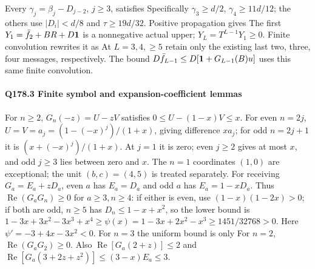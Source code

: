 Every $\gamma_j=\allowbreak \beta_j-D_{j-2}$, $j\ge\allowbreak 3$, satisfies
Specifically $\gamma_3\ge\allowbreak  d/2$, $\gamma_4\ge\allowbreak 11d/12$;
the others use $|D_i|<\allowbreak d/8$ and $\tau\ge\allowbreak 19d/32$.
Positive propagation gives
The first $Y_1=\allowbreak \bar f_2+BR+D\mathbf1$ is a nonnegative actual upper;
$Y_L=\allowbreak T^{L-1}Y_1\ge\allowbreak 0$. Finite convolution rewrites it as
At $L=\allowbreak 3,\allowbreak 4,\allowbreak \ge\allowbreak 5$ retain only the existing last two, three, four messages,
respectively. The bound $D\bar f_{L-1}\le\allowbreak  D[\mathbf1+G_{L-1}(B)u]$
uses this same finite convolution.

\paragraph{Q178.3 Finite symbol and expansion-coefficient lemmas}\label{part:Q178.3}
For $n\ge\allowbreak 2$, $G_n(-z)=\allowbreak U-zV$ satisfies
$0\le\allowbreak  U-(1-x)V\le\allowbreak  x$.
For even $n=\allowbreak 2j$, $U=\allowbreak V=\allowbreak a_j=\allowbreak (1-(-x)^j)/(1+x)$, giving difference
$xa_j$; for odd $n=\allowbreak 2j+1$ it is $(x+(-x)^j)/(1+x)$.
At $j=\allowbreak 1$ it is zero; even $j\ge\allowbreak 2$ gives at most $x$, and odd $j\ge\allowbreak 3$
lies between zero and $x$.
The $n=\allowbreak 1$ coordinates $(1,\allowbreak 0)$ are exceptional; the unit $(b,\allowbreak c)=\allowbreak (4,\allowbreak 5)$
is treated separately.
For receiving $G_a=\allowbreak E_a+zD_a$, even $a$ has $E_a=\allowbreak D_a$ and odd $a$
has $E_a=\allowbreak 1-xD_a$.
Thus $\operatorname{Re}(G_aG_n)\ge\allowbreak 0$ for $a\ge\allowbreak 3,\allowbreak n\ge\allowbreak 4$:
if either is even, use $(1-x)(1-2x)>\allowbreak 0$;
if both are odd, $n\ge\allowbreak 5$ has $D_n\le\allowbreak 1-x+x^2$, so the lower bound is
$1-3x+3x^2-3x^3+x^4\ge\psi(x)=1-3x+2x^2-x^3
\ge1451/32768>0$.
Here $\psi'=\allowbreak -3+4x-3x^2<\allowbreak 0$.
For $n=\allowbreak 3$ the uniform bound is only
For $n=\allowbreak 2$, $\operatorname{Re}(G_aG_2)\ge\allowbreak 0$.
Also $\operatorname{Re}[G_a(2+z)]\le\allowbreak 2$ and
$\operatorname{Re}[G_a(3+2z+z^2)]\le\allowbreak (3-x)E_a\le\allowbreak 3$.

